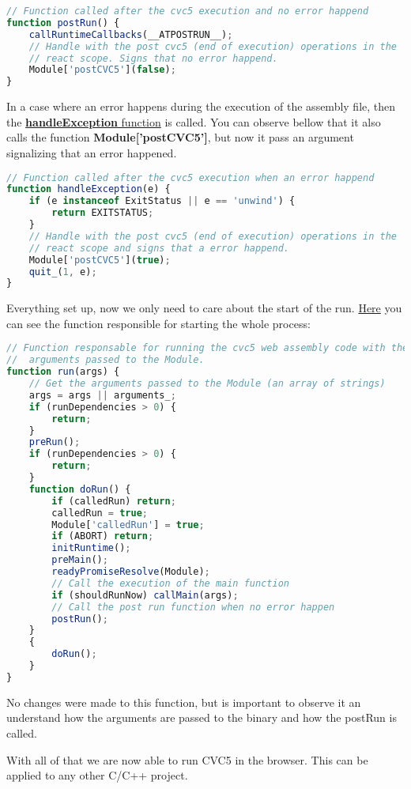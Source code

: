 \documentclass[12pt, a4paper]{article}
\begin{document}
\begin{lstlisting}[language=JavaScript]
// Function called after the cvc5 execution and no error happend
function postRun() {
    callRuntimeCallbacks(__ATPOSTRUN__);
    // Handle with the post cvc5 (end of execution) operations in the
    // react scope. Signs that no error happend.
    Module['postCVC5'](false);
}
\end{lstlisting}

In a case where an error happens during the execution of the assembly file, then the \href{https://github.com/ufmg-smite/proof-visualizer/blob/main/frontend/src/wasm/cvc5.js#L420-L429 }{\textbf{handleException} function} is called. You can observe bellow that it also calls the function \textbf{Module['postCVC5']}, but now it pass an argument signalizing that an error happened.

\begin{lstlisting}[language=JavaScript]
// Function called after the cvc5 execution when an error happend
function handleException(e) {
    if (e instanceof ExitStatus || e == 'unwind') {
        return EXITSTATUS;
    }
    // Handle with the post cvc5 (end of execution) operations in the
    // react scope and signs that a error happend.
    Module['postCVC5'](true);
    quit_(1, e);
}
\end{lstlisting}

Everything set up, now we only need to care about the start of the run. \href{https://github.com/ufmg-smite/proof-visualizer/blob/main/frontend/src/wasm/cvc5.js#L3674-L3702}{Here} you can see the function responsible for starting the whole process:

\begin{lstlisting}[language=JavaScript]
// Function responsable for running the cvc5 web assembly code with the
//  arguments passed to the Module.
function run(args) {
    // Get the arguments passed to the Module (an array of strings)
    args = args || arguments_;
    if (runDependencies > 0) {
        return;
    }
    preRun();
    if (runDependencies > 0) {
        return;
    }
    function doRun() {
        if (calledRun) return;
        calledRun = true;
        Module['calledRun'] = true;
        if (ABORT) return;
        initRuntime();
        preMain();
        readyPromiseResolve(Module);
        // Call the execution of the main function
        if (shouldRunNow) callMain(args);
        // Call the post run function when no error happen
        postRun();
    }
    {
        doRun();
    }
}
\end{lstlisting}

No changes were made to this function, but is important to observe it an understand how the arguments are passed to the binary and how the postRun is called.

With all of that we are now able to run CVC5 in the browser. This can be applied to any other C/C++ project.
\end{document}

